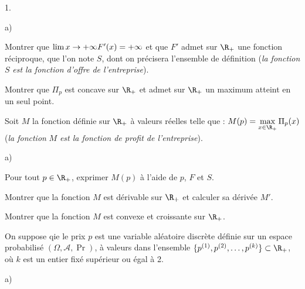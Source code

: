 \documentclass[11pt]{article}%
\begin{document}
\begin{noliste}{1.}
 \setlength{\itemsep}{4mm}

\item \begin{noliste}{a)}
 \setlength{\itemsep}{2mm}

\item Montrer que $\lim{x \rightarrow + \infty} F'(x) = + \infty$ et
que $F'$ admet sur $\R_+ $ une fonction réciproque, que l'on note $S$,
dont on précisera l'ensemble de définition (\textit{la fonction} $S$
\textit{est la fonction d'offre de l'entreprise}). \\

\item Montrer que $\Pi_{p}$ est concave sur $\R_+ $ et admet sur $\R_+
$ un maximum atteint en un seul point. \\

\end{noliste}

\item Soit $M$ la fonction définie sur $\R_+ $ à valeurs réelles telle
que : $M(p) = \max\limits_{x \in \R_+} \Pi_{p}(x)$ (\textit{la
fonction} $M$ \textit{est la fonction de profit de l'entreprise}).

\begin{noliste}{a)}
 \setlength{\itemsep}{2mm}

\item Pour tout $p \in \R_+ $, exprimer $M(p)$ à l'aide de $p$, $F$ et
$S$. \\

\item Montrer que la fonction $M$ est dérivable sur $\R_+ $ et calculer
sa dérivée $M'$. \\

\item Montrer que la fonction $M$ est convexe et croissante sur $\R_+
$. \\

\end{noliste}

\item On suppose qie le prix $p$ est une variable aléatoire discrète
définie sur un espace probabilisé $(\Omega, \mathcal{A}, \Pr)$, à
valeurs dans l'ensemble $\{p^{(1)}, p^{(2)}, \dots, p^{(k)} \} \subset
\R_+ $, où $k$ est un entier fixé supérieur ou égal à 2.

\begin{noliste}{a)}
 \setlength{\itemsep}{2mm}


\end{noliste}
\end{noliste}
\end{document}
